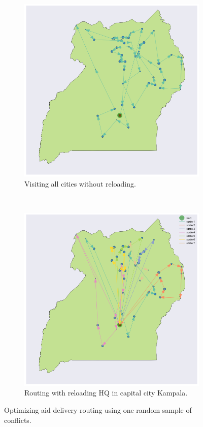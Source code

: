 \documentclass[a0,final]{a0poster}
\begin{document}
\begin{multicols}{3}
\begin{figure}[H]
  \centering
  \begin{subfigure}[b]{0.5\columnwidth}
    \centering
    \includegraphics[width=\textwidth]{../write-up/figures/routing-vanilla-tsp}
    \caption{Visiting all cities without reloading.}
    \label{fig:routing-vanilla-tsp}
  \end{subfigure}~\begin{subfigure}[b]{0.5\columnwidth}
    \centering
    \includegraphics[width=\textwidth]{../write-up/figures/routing-reloading}
    \caption{Routing with reloading HQ in capital city Kampala.}
    \label{fig:routing-reloading}
  \end{subfigure}
  \caption{Optimizing aid delivery routing using one random sample of conflicts.}
\end{figure}


\end{multicols}
\end{document}
